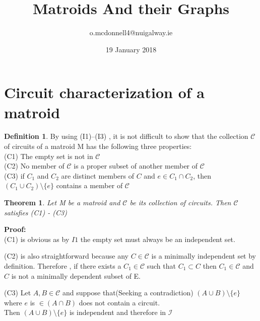 \documentclass{article}
\title{Matroids And their Graphs}
\author{o.mcdonnell4@nuigalway.ie }
\date{19 January 2018}
\theoremstyle{plain}
\newtheorem{thm}{Theorem}[section]
\theoremstyle{definition}
\newtheorem{defn}{Definition}[section]
\theoremstyle{remark}
\newcommand\Proof{%
    \textbf{Proof:}~%
}
\begin{document}
\maketitle
 
 \section{Circuit characterization of a matroid}

\begin{defn} By using (I1)–(I3) , it is not difficult to show that the collection $\mathcal{C}$ of circuits of a matroid M has the following three properties:\\
(C1) The empty set is not in $\mathcal{C}$\\
(C2) No member of $\mathcal{C}$ is a proper subset of another member of $\mathcal{C}$\\
(C3) if $ C_1 $ and $ C_2 $ are distinct members of $ C $ and 
$ e \in C_1 \cap C_2 $, then $ (C_1 \cup C_2 ) \setminus \{e\} $ contains a member of $\mathcal{C}$ 
 \end{defn}
 
 \vspace{5mm}
 
 \begin{thm}
 Let M be a matroid and $\mathcal{C}$ be its collection of circuits. Then $\mathcal{C}$ satisfies (C1) - (C3)
  \end{thm}
 
 \noindent\textbf\Proof \\
 \noindent (C1) is obvious as by $I1$ the empty set must always be an independent set.
 
 \vspace{2mm}
 
 \noindent (C2) is also straightforward because any $ C \in \mathcal{C} $ is a minimally independent set by definition. Therefore , if there exists a $ C_1 \in \mathcal{C} $ such that $ C_1 \subset C $ then $ C_1 \in \mathcal{C} $ and $ C $ is not a minimally dependent subset of E. 
 
 \vspace{2mm}
 
 \noindent (C3) Let $ A, B \in \mathcal{C} $ and suppose that(Seeking a contradiction) $ (A \cup B) \setminus \{e\} $ where $ e $ is $ \in (A \cap B) $ does not contain a circuit.\\
 \noindent Then $ (A \cup B) \setminus \{e\} $ is independent and therefore in $\mathcal{I}$
 
 \vspace{2mm}
 
\end{document}
